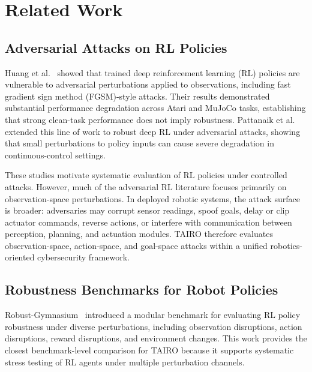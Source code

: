 \documentclass[conference]{IEEEtran}
\begin{document}
\section{Related Work}
\label{sec:related}

\subsection{Adversarial Attacks on RL Policies}

Huang et al.~\cite{huang2017adversarial} showed that trained deep reinforcement
learning (RL) policies are vulnerable to adversarial perturbations applied to
observations, including fast gradient sign method (FGSM)-style attacks. Their results
demonstrated substantial performance degradation across Atari and MuJoCo tasks,
establishing that strong clean-task performance does not imply robustness. Pattanaik
et al.~\cite{pattanaik2018robust} extended this line of work to robust deep RL under
adversarial attacks, showing that small perturbations to policy inputs can cause severe
degradation in continuous-control settings.

These studies motivate systematic evaluation of RL policies under controlled attacks.
However, much of the adversarial RL literature focuses primarily on observation-space
perturbations. In deployed robotic systems, the attack surface is broader: adversaries
may corrupt sensor readings, spoof goals, delay or clip actuator commands, reverse
actions, or interfere with communication between perception, planning, and actuation
modules. TAIRO therefore evaluates observation-space, action-space, and goal-space
attacks within a unified robotics-oriented cybersecurity framework.

\subsection{Robustness Benchmarks for Robot Policies}

Robust-Gymnasium~\cite{gu2025robustgymnasium} introduced a modular benchmark for
evaluating RL policy robustness under diverse perturbations, including observation
disruptions, action disruptions, reward disruptions, and environment changes. This work
provides the closest benchmark-level comparison for TAIRO because it supports systematic
stress testing of RL agents under multiple perturbation channels.
\end{document}
